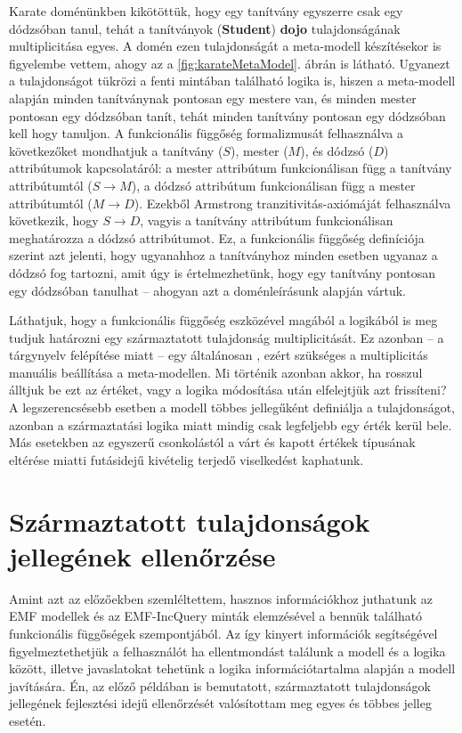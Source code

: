Karate doménünkben kikötöttük, hogy egy tanítvány egyszerre csak egy dódzsóban tanul, tehát a tanítványok (\textbf{Student}) \textbf{dojo} tulajdonságának multiplicitása egyes.
A domén ezen tulajdonságát a meta-modell készítésekor is figyelembe vettem, ahogy az a \ref{fig:karateMetaModel}. ábrán is látható.
Ugyanezt a tulajdonságot tükrözi a fenti mintában található logika is, hiszen a meta-modell alapján minden tanítványnak pontosan egy mestere van, és minden mester pontosan egy dódzsóban tanít, tehát minden tanítvány pontosan egy dódzsóban kell hogy tanuljon.
A funkcionális függőség formalizmusát felhasználva a következőket mondhatjuk a tanítvány ($S$), mester ($M$), és dódzsó ($D$) attribútumok kapcsolatáról: a mester attribútum funkcionálisan függ a tanítvány attribútumtól ($S \rightarrow M$), a dódzsó attribútum funkcionálisan függ a mester attribútumtól ($M \rightarrow D$).
Ezekből Armstrong tranzitivitás-axiómáját felhasználva következik, hogy $S \rightarrow D$, vagyis a tanítvány attribútum funkcionálisan meghatározza a dódzsó attribútumot.
Ez, a funkcionális függőség definíciója szerint azt jelenti, hogy ugyanahhoz a tanítványhoz minden esetben ugyanaz a dódzsó fog tartozni, amit úgy is értelmezhetünk, hogy egy tanítvány pontosan egy dódzsóban tanulhat -- ahogyan azt a doménleírásunk alapján vártuk.

Láthatjuk, hogy a funkcionális függőség eszközével magából a logikából is meg tudjuk határozni egy származtatott tulajdonság multiplicitását.
Ez azonban -- a tárgynyelv felépítése miatt -- egy általánosan , ezért szükséges a multiplicitás manuális beállítása a meta-modellen.
Mi történik azonban akkor, ha rosszul álltjuk be ezt az értéket, vagy a logika módosítása után elfelejtjük azt frissíteni?
A legszerencsésebb esetben a modell többes jellegűként definiálja a tulajdonságot, azonban a származtatási logika miatt mindig csak legfeljebb egy érték kerül bele. Más esetekben az egyszerű csonkolástól a várt és kapott értékek típusának eltérése miatti futásidejű kivételig terjedő viselkedést kaphatunk.

\section{Származtatott tulajdonságok jellegének ellenőrzése}

Amint azt az előzőekben szemléltettem, hasznos információkhoz juthatunk az EMF modellek és az EMF-IncQuery minták elemzésével a bennük található funkcionális függőségek szempontjából.
Az így kinyert információk segítségével figyelmeztethetjük a felhasználót ha ellentmondást találunk a modell és a logika között, illetve javaslatokat tehetünk a logika információtartalma alapján a modell javítására.
Én, az előző példában is bemutatott, származtatott tulajdonságok jellegének fejlesztési idejű ellenőrzését valósítottam meg egyes és többes jelleg esetén.

